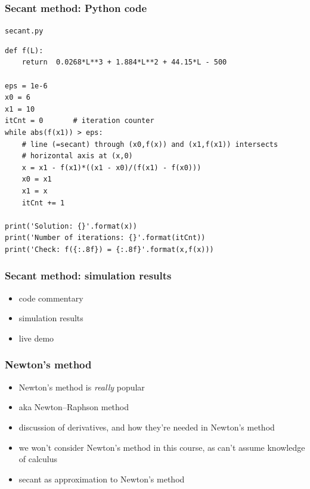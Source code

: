 \documentclass[english,14pt]{beamer}
\begin{document}

\begin{frame}[fragile]

\frametitle{Secant method: Python code}

\texttt{secant.py}
\begin{lstlisting}[style=CStyle,basicstyle=\scriptsize]
def f(L):
    return  0.0268*L**3 + 1.884*L**2 + 44.15*L - 500

eps = 1e-6
x0 = 6
x1 = 10
itCnt = 0       # iteration counter
while abs(f(x1)) > eps:
    # line (=secant) through (x0,f(x)) and (x1,f(x1)) intersects
    # horizontal axis at (x,0)
    x = x1 - f(x1)*((x1 - x0)/(f(x1) - f(x0)))
    x0 = x1
    x1 = x
    itCnt += 1

print('Solution: {}'.format(x))
print('Number of iterations: {}'.format(itCnt))
print('Check: f({:.8f}) = {:.8f}'.format(x,f(x)))
\end{lstlisting}

\end{frame}


\begin{frame}[fragile]

\frametitle{Secant method: simulation results}

\begin{itemize}
	\item code commentary
	\item simulation results
	\item live demo
\end{itemize}

\end{frame}


\begin{frame}[fragile]

\frametitle{Newton's method}

\begin{itemize}
	\item Newton's method is \emph{really} popular
	\item aka Newton--Raphson method
	\item discussion of derivatives, and how they're needed in Newton's method
	\item we won't consider Newton's method in this course, as can't assume knowledge of calculus
	\item secant as approximation to Newton's method
\end{itemize}

\end{frame}
\end{document}
